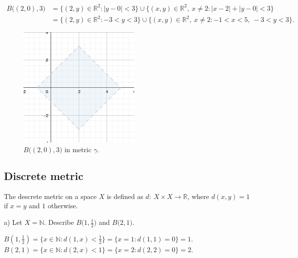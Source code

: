 \documentclass[a4paper,11pt]{article}
\begin{document}
\begin{align*} 
    B \big((2, 0), 3 \big) &= \{(2,y) \in \mathbb{R}^2 : |y - 0| < 3 \} \cup \{(x,y) \in \mathbb{R}^2, \ x \neq 2 : |x - 2| + |y - 0| < 3 \}
    \\
    &= \{(2,y) \in \mathbb{R}^2 : -3 < y < 3 \} \cup \{(x,y) \in \mathbb{R}^2 , \ x \neq 2: -1 < x < 5, \ -3< y < 3 \}.
\end{align*}

\begin{figure}[ht!]
    \centering
    \includegraphics[width=60mm]{d3.png}
    \caption{$B \big((2, 0), 3 \big)$ in metric $\gamma$.}
\end{figure}




\subsection{Discrete metric}
The descrete metric on a space $X$ is defined as $d: \ X \times X \to \mathbb{R}$, where $d(x, y) = 1$ if $x = y$ and $1$ otherwise.

\noindent
a) Let $X = \mathbb{N}$. Describe $B \big(1, \frac{1}{2} \big)$ and $B \big(2, 1 \big)$.

\begin{center}
$ B \left(1, \frac{1}{2} \right) = \{ x \in \mathbb{N} : d(1, x) < \frac{1}{2} \} = \{ x = 1 : d(1, 1) = 0 \} = {1}. $
\\
$ B (2, 1) = \{ x \in \mathbb{N} : d(2, x) < 1 \} = \{ x = 2 : d(2, 2) = 0 \} = {2}. $
\\
\end{center}

\end{document}
